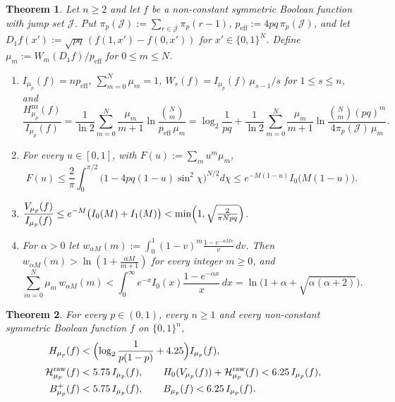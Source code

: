 \documentclass[11pt]{amsart}
\newtheorem{theorem}{Theorem}
\theoremstyle{remark}
\newcommand{\Hraw}{\mathcal{H}^{\mathrm{raw}}}
\newcommand{\peff}{p_{\mathrm{eff}}}
\newcommand{\J}{\mathcal{J}}
\begin{document}
\begin{theorem}\label{thm:A}
Let $n \ge 2$ and let $f$ be a non-constant symmetric Boolean function with jump set $\J$. Put $\pi_p(\J) := \sum_{r \in \J} \pi_p(r-1)$, $\peff := 4pq\, \pi_p(\J)$, and let $D_1 f(x') := \sqrt{pq}\,(f(1,x') - f(0,x'))$ for $x' \in \{0,1\}^N$. Define $\mu_m := W_m(D_1 f)/\peff$ for $0 \le m \le N$.
\begin{enumerate}
\item $I_{\mu_p}(f) = n \peff$, $\sum_{m=0}^N \mu_m = 1$, $W_s(f) = I_{\mu_p}(f)\, \mu_{s-1}/s$ for $1 \le s \le n$, and
\begin{equation}\label{eq:A1}
\frac{H^{\mathrm{nz}}_{\mu_p}(f)}{I_{\mu_p}(f)} = \frac{1}{\ln 2}\sum_{m=0}^N \frac{\mu_m}{m+1}\ln \frac{\binom{N}{m}}{\peff\, \mu_m}
= \log_2 \frac{1}{pq} + \frac{1}{\ln 2}\sum_{m=0}^N \frac{\mu_m}{m+1} \ln \frac{\binom{N}{m}(pq)^m}{4\pi_p(\J)\,\mu_m}.
\end{equation}
\item For every $u \in [0,1]$, with $F(u) := \sum_m u^m \mu_m$,
\begin{equation}\label{eq:A2}
F(u) \le \frac{2}{\pi}\int_0^{\pi/2} \bigl(1 - 4pq(1-u)\sin^2\chi\bigr)^{N/2} d\chi \le e^{-M(1-u)} I_0\bigl(M(1-u)\bigr).
\end{equation}
\item $\displaystyle \frac{V_{\mu_p}(f)}{I_{\mu_p}(f)} \le e^{-M}\bigl(I_0(M) + I_1(M)\bigr) < \min\Bigl(1, \sqrt{\tfrac{2}{\pi N pq}}\Bigr)$.
\item For $\alpha > 0$ let $w_{\alpha M}(m) := \int_0^1 (1-v)^m \frac{1 - e^{-\alpha M v}}{v}\, dv$. Then $w_{\alpha M}(m) > \ln(1 + \frac{\alpha M}{m+1})$ for every integer $m \ge 0$, and
\[
\sum_{m=0}^N \mu_m\, w_{\alpha M}(m) < \int_0^\infty e^{-x} I_0(x) \frac{1 - e^{-\alpha x}}{x}\, dx = \ln\bigl(1 + \alpha + \sqrt{\alpha(\alpha+2)}\bigr).
\]
\end{enumerate}
\end{theorem}

\begin{theorem}\label{thm:B}
For every $p \in (0,1)$, every $n \ge 1$ and every non-constant symmetric Boolean function $f$ on $\{0,1\}^n$,
\begin{align}
H_{\mu_p}(f) &< \Bigl(\log_2 \frac{1}{p(1-p)} + 4.25\Bigr) I_{\mu_p}(f), \label{eq:B1}\\
\Hraw_{\mu_p}(f) &< 5.75\, I_{\mu_p}(f), \qquad H_0(V_{\mu_p}(f)) + \Hraw_{\mu_p}(f) < 6.25\, I_{\mu_p}(f), \label{eq:B2}\\
B^+_{\mu_p}(f) &< 5.75\, I_{\mu_p}(f), \qquad B_{\mu_p}(f) < 6.25\, I_{\mu_p}(f). \label{eq:B3}
\end{align}
\end{theorem}
\end{document}
